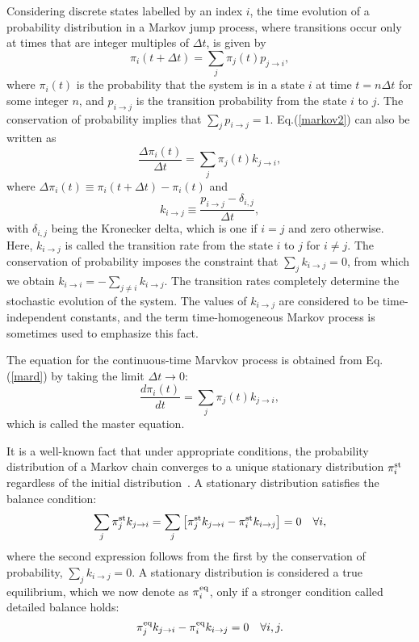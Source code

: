 \documentclass[aps,pre,amsmath,amssymb,floatfix,preprint,nofootinbib]{revtex4}
\begin{document}
Considering discrete states labelled by an index $i$, the time evolution of a probability distribution in a Markov jump process, where transitions occur only at times that are integer multiples of $\Delta t$, is given by
~\cite{markov1}
\begin{equation}
\pi_i\left(t + \Delta t \right) = \sum_j \pi_j(t) p_{j \to i},  \label{markov2}
\end{equation}
where  $\pi_i(t)$ is the probability that the system is in a state $i$ at time $t=n\Delta t$ for some integer $n$, and $p_{i \to j}$ is the transition probability from the state $i$ to $j$. The conservation of probability implies that $\sum_j p_{i \to j} = 1$. Eq.(\ref{markov2}) can also be written as
\begin{equation}
\frac{\Delta \pi_i(t)}{\Delta t} = \sum_j \pi_j(t ) k_{j \to i},  \label{mard}
\end{equation}
where $\Delta \pi_i(t) \equiv \pi_i(t + \Delta t) - \pi_i(t)$ and
\begin{equation}
k_{i \to j} \equiv \frac{ p_{i \to j}-\delta_{i,j}}{\Delta t},\label{rate}
\end{equation}
with $\delta_{i,j}$ being the Kronecker delta, which is one if $i= j$ and zero otherwise. Here, $k_{i \to j}$ is called the transition rate from the state $i$ to $j$ for $i \ne j$.  The conservation of probability imposes the constraint that $\sum_j k_{i \to j} = 0$, from which we obtain $k_{i \to i} = -\sum_{j \ne i} k_{i \to j}$. The transition rates completely determine the stochastic evolution of the system. The values of $k_{i \to j}$ are considered to be time-independent constants, and the term time-homogeneous Markov process is sometimes used to emphasize this fact.

 The equation for the continuous-time Marvkov process is obtained from Eq.(\ref{mard}) by taking the limit $\Delta t \to 0$:
\begin{equation}
\frac{d \pi_i(t)}{dt} = \sum_j  \pi_j(t) k_{j \to i} ,\label{markov}
\end{equation}
which is called the master equation. 
  
 It is a well-known fact that under appropriate conditions, the probability distribution of a Markov chain converges to a unique stationary distribution $\pi^{\rm st}_i$ regardless of the initial distribution~\cite{markov1}. A stationary distribution satisfies the balance condition:
\begin{equation}
\sum_j  \pi^{\rm st}_j k_{j \to i}=\sum_j \left[ \pi^{\rm st}_j k_{j \to i} -  \pi^{\rm st}_i k_{i \to j} \right] = 0\quad \forall i , \label{balance}
\end{equation}
where the second expression follows from the first by the conservation of probability, $\sum_j k_{i \to j} =0$. 
  A stationary distribution is considered a true equilibrium, which we now denote as $\pi^{\rm eq}_i$, only if a stronger condition called detailed balance holds:
\begin{equation}
\pi^{\rm eq}_j k_{j \to i} -  \pi^{\rm eq}_i k_{i \to j} =0\quad \forall i,j. \label{db}
\end{equation}
  
\end{document}

